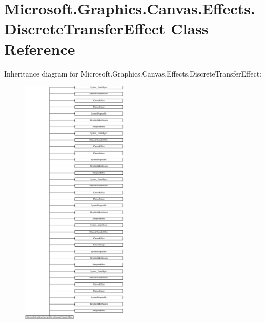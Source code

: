 \hypertarget{class_microsoft_1_1_graphics_1_1_canvas_1_1_effects_1_1_discrete_transfer_effect}{}\section{Microsoft.\+Graphics.\+Canvas.\+Effects.\+Discrete\+Transfer\+Effect Class Reference}
\label{class_microsoft_1_1_graphics_1_1_canvas_1_1_effects_1_1_discrete_transfer_effect}
Inheritance diagram for Microsoft.\+Graphics.\+Canvas.\+Effects.\+Discrete\+Transfer\+Effect\+:\begin{figure}[H]
\begin{center}
\leavevmode
\includegraphics[height=12.000000cm]{class_microsoft_1_1_graphics_1_1_canvas_1_1_effects_1_1_discrete_transfer_effect}
\end{center}
\end{figure}
